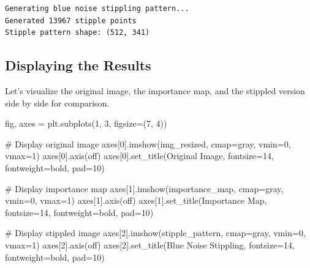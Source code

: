 \documentclass[
  letterpaper,
  DIV=11,
  numbers=noendperiod]{scrartcl}
\newenvironment{Shaded}{\begin{snugshade}}{\end{snugshade}}
\newcommand{\CommentTok}[1]{\textcolor[rgb]{0.37,0.37,0.37}{#1}}
\newcommand{\DecValTok}[1]{\textcolor[rgb]{0.68,0.00,0.00}{#1}}
\newcommand{\NormalTok}[1]{\textcolor[rgb]{0.00,0.23,0.31}{#1}}
\newcommand{\OperatorTok}[1]{\textcolor[rgb]{0.37,0.37,0.37}{#1}}
\newcommand{\StringTok}[1]{\textcolor[rgb]{0.13,0.47,0.30}{#1}}
\begin{document}
\begin{verbatim}
Generating blue noise stippling pattern...
Generated 13967 stipple points
Stipple pattern shape: (512, 341)
\end{verbatim}

\subsection{Displaying the Results}\label{displaying-the-results}

Let's visualize the original image, the importance map, and the stippled
version side by side for comparison.

\begin{Shaded}
\begin{Highlighting}[]
\NormalTok{fig, axes }\OperatorTok{=}\NormalTok{ plt.subplots(}\DecValTok{1}\NormalTok{, }\DecValTok{3}\NormalTok{, figsize}\OperatorTok{=}\NormalTok{(}\DecValTok{7}\NormalTok{, }\DecValTok{4}\NormalTok{))}

\CommentTok{\# Display original image}
\NormalTok{axes[}\DecValTok{0}\NormalTok{].imshow(img\_resized, cmap}\OperatorTok{=}\StringTok{\textquotesingle{}gray\textquotesingle{}}\NormalTok{, vmin}\OperatorTok{=}\DecValTok{0}\NormalTok{, vmax}\OperatorTok{=}\DecValTok{1}\NormalTok{)}
\NormalTok{axes[}\DecValTok{0}\NormalTok{].axis(}\StringTok{\textquotesingle{}off\textquotesingle{}}\NormalTok{)}
\NormalTok{axes[}\DecValTok{0}\NormalTok{].set\_title(}\StringTok{\textquotesingle{}Original Image\textquotesingle{}}\NormalTok{, fontsize}\OperatorTok{=}\DecValTok{14}\NormalTok{, fontweight}\OperatorTok{=}\StringTok{\textquotesingle{}bold\textquotesingle{}}\NormalTok{, pad}\OperatorTok{=}\DecValTok{10}\NormalTok{)}

\CommentTok{\# Display importance map}
\NormalTok{axes[}\DecValTok{1}\NormalTok{].imshow(importance\_map, cmap}\OperatorTok{=}\StringTok{\textquotesingle{}gray\textquotesingle{}}\NormalTok{, vmin}\OperatorTok{=}\DecValTok{0}\NormalTok{, vmax}\OperatorTok{=}\DecValTok{1}\NormalTok{)}
\NormalTok{axes[}\DecValTok{1}\NormalTok{].axis(}\StringTok{\textquotesingle{}off\textquotesingle{}}\NormalTok{)}
\NormalTok{axes[}\DecValTok{1}\NormalTok{].set\_title(}\StringTok{\textquotesingle{}Importance Map\textquotesingle{}}\NormalTok{, fontsize}\OperatorTok{=}\DecValTok{14}\NormalTok{, fontweight}\OperatorTok{=}\StringTok{\textquotesingle{}bold\textquotesingle{}}\NormalTok{, pad}\OperatorTok{=}\DecValTok{10}\NormalTok{)}

\CommentTok{\# Display stippled image}
\NormalTok{axes[}\DecValTok{2}\NormalTok{].imshow(stipple\_pattern, cmap}\OperatorTok{=}\StringTok{\textquotesingle{}gray\textquotesingle{}}\NormalTok{, vmin}\OperatorTok{=}\DecValTok{0}\NormalTok{, vmax}\OperatorTok{=}\DecValTok{1}\NormalTok{)}
\NormalTok{axes[}\DecValTok{2}\NormalTok{].axis(}\StringTok{\textquotesingle{}off\textquotesingle{}}\NormalTok{)}
\NormalTok{axes[}\DecValTok{2}\NormalTok{].set\_title(}\StringTok{\textquotesingle{}Blue Noise Stippling\textquotesingle{}}\NormalTok{, fontsize}\OperatorTok{=}\DecValTok{14}\NormalTok{, fontweight}\OperatorTok{=}\StringTok{\textquotesingle{}bold\textquotesingle{}}\NormalTok{, pad}\OperatorTok{=}\DecValTok{10}\NormalTok{)}


\end{Highlighting}
\end{Shaded}
\end{document}
